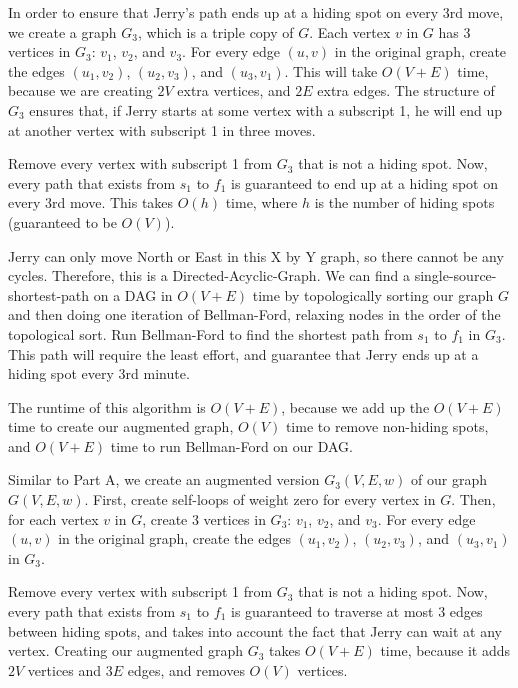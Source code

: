 \documentclass[12pt,twoside]{article}
\begin{document}
\begin{problems}
\begin{problemparts}
\end{problemparts}

\problem  %

\begin{problemparts}
\problempart

In order to ensure that Jerry's path ends up at a hiding spot on every 3rd move, we create a graph $G_3$, which is a triple copy of $G$. Each vertex $v$ in $G$ has 3 vertices in $G_3$: $v_1$, $v_2$, and $v_3$. For every edge $(u, v)$ in the original graph, create the edges $(u_1, v_2)$, $(u_2, v_3)$, and $(u_3, v_1)$. This will take $O(V + E)$ time, because we are creating $2V$ extra vertices, and $2E$ extra edges. The structure of $G_3$ ensures that, if Jerry starts at some vertex with a subscript 1, he will end up at another vertex with subscript 1 in three moves.

Remove every vertex with subscript 1 from $G_3$ that is not a hiding spot. Now, every path that exists from $s_1$ to $f_1$ is guaranteed to end up at a hiding spot on every 3rd move. This takes $O(h)$ time, where $h$ is the number of hiding spots (guaranteed to be $O(V)$). 

Jerry can only move North or East in this X by Y graph, so there cannot be any cycles. Therefore, this is a Directed-Acyclic-Graph. We can find a single-source-shortest-path on a DAG in $O(V+E)$ time by topologically sorting our graph $G$ and then doing one iteration of Bellman-Ford, relaxing nodes in the order of the topological sort. Run Bellman-Ford to find the shortest path from $s_1$ to $f_1$ in $G_3$. This path will require the least effort, and guarantee that Jerry ends up at a hiding spot every 3rd minute.

The runtime of this algorithm is $O(V+E)$, because we add up the $O(V+E)$ time to create our augmented graph, $O(V)$ time to remove non-hiding spots, and $O(V+E)$ time to run Bellman-Ford on our DAG.


\problempart 

Similar to Part A, we create an augmented version $G_3(V, E, w)$ of our graph $G(V, E, w)$. First, create self-loops of weight zero for every vertex in $G$. Then, for each vertex $v$ in $G$, create 3 vertices in $G_3$: $v_1$, $v_2$, and $v_3$. For every edge $(u, v)$ in the original graph, create the edges $(u_1, v_2)$, $(u_2, v_3)$, and $(u_3, v_1)$ in $G_3$. 

Remove every vertex with subscript 1 from $G_3$ that is not a hiding spot. Now, every path that exists from $s_1$ to $f_1$ is guaranteed to traverse at most 3 edges between hiding spots, and takes into account the fact that Jerry can wait at any vertex. Creating our augmented graph $G_3$ takes $O(V+E)$ time, because it adds $2V$ vertices and $3E$ edges, and removes $O(V)$ vertices.


\end{problemparts}
\end{problems}
\end{document}

